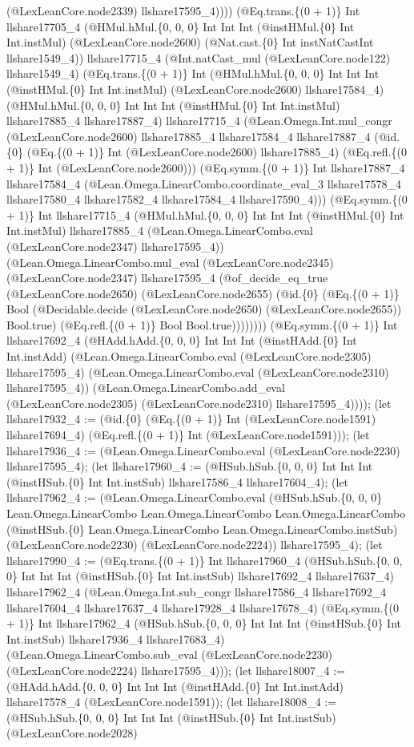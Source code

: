 \documentclass[11pt]{article}
\begin{document}
(@LexLeanCore.node2339) llshare17595\_4)))) (@Eq.trans.\{(0 + 1)\} Int llshare17705\_4 (@HMul.hMul.\{0, 0, 0\} Int Int Int (@instHMul.\{0\} Int Int.instMul) (@LexLeanCore.node2600) (@Nat.cast.\{0\} Int instNatCastInt llshare1549\_4)) llshare17715\_4 (@Int.natCast\_mul (@LexLeanCore.node122) llshare1549\_4) (@Eq.trans.\{(0 + 1)\} Int (@HMul.hMul.\{0, 0, 0\} Int Int Int (@instHMul.\{0\} Int Int.instMul) (@LexLeanCore.node2600) llshare17584\_4) (@HMul.hMul.\{0, 0, 0\} Int Int Int (@instHMul.\{0\} Int Int.instMul) llshare17885\_4 llshare17887\_4) llshare17715\_4 (@Lean.Omega.Int.mul\_congr (@LexLeanCore.node2600) llshare17885\_4 llshare17584\_4 llshare17887\_4 (@id.\{0\} (@Eq.\{(0 + 1)\} Int (@LexLeanCore.node2600) llshare17885\_4) (@Eq.refl.\{(0 + 1)\} Int (@LexLeanCore.node2600))) (@Eq.symm.\{(0 + 1)\} Int llshare17887\_4 llshare17584\_4 (@Lean.Omega.LinearCombo.coordinate\_eval\_3 llshare17578\_4 llshare17580\_4 llshare17582\_4 llshare17584\_4 llshare17590\_4))) (@Eq.symm.\{(0 + 1)\} Int llshare17715\_4 (@HMul.hMul.\{0, 0, 0\} Int Int Int (@instHMul.\{0\} Int Int.instMul) llshare17885\_4 (@Lean.Omega.LinearCombo.eval (@LexLeanCore.node2347) llshare17595\_4)) (@Lean.Omega.LinearCombo.mul\_eval (@LexLeanCore.node2345) (@LexLeanCore.node2347) llshare17595\_4 (@of\_decide\_eq\_true (@LexLeanCore.node2650) (@LexLeanCore.node2655) (@id.\{0\} (@Eq.\{(0 + 1)\} Bool (@Decidable.decide (@LexLeanCore.node2650) (@LexLeanCore.node2655)) Bool.true) (@Eq.refl.\{(0 + 1)\} Bool Bool.true)))))))) (@Eq.symm.\{(0 + 1)\} Int llshare17692\_4 (@HAdd.hAdd.\{0, 0, 0\} Int Int Int (@instHAdd.\{0\} Int Int.instAdd) (@Lean.Omega.LinearCombo.eval (@LexLeanCore.node2305) llshare17595\_4) (@Lean.Omega.LinearCombo.eval (@LexLeanCore.node2310) llshare17595\_4)) (@Lean.Omega.LinearCombo.add\_eval (@LexLeanCore.node2305) (@LexLeanCore.node2310) llshare17595\_4)))); (let llshare17932\_4 := (@id.\{0\} (@Eq.\{(0 + 1)\} Int (@LexLeanCore.node1591) llshare17694\_4) (@Eq.refl.\{(0 + 1)\} Int (@LexLeanCore.node1591))); (let llshare17936\_4 := (@Lean.Omega.LinearCombo.eval (@LexLeanCore.node2230) llshare17595\_4); (let llshare17960\_4 := (@HSub.hSub.\{0, 0, 0\} Int Int Int (@instHSub.\{0\} Int Int.instSub) llshare17586\_4 llshare17604\_4); (let llshare17962\_4 := (@Lean.Omega.LinearCombo.eval (@HSub.hSub.\{0, 0, 0\} Lean.Omega.LinearCombo Lean.Omega.LinearCombo Lean.Omega.LinearCombo (@instHSub.\{0\} Lean.Omega.LinearCombo Lean.Omega.LinearCombo.instSub) (@LexLeanCore.node2230) (@LexLeanCore.node2224)) llshare17595\_4); (let llshare17990\_4 := (@Eq.trans.\{(0 + 1)\} Int llshare17960\_4 (@HSub.hSub.\{0, 0, 0\} Int Int Int (@instHSub.\{0\} Int Int.instSub) llshare17692\_4 llshare17637\_4) llshare17962\_4 (@Lean.Omega.Int.sub\_congr llshare17586\_4 llshare17692\_4 llshare17604\_4 llshare17637\_4 llshare17928\_4 llshare17678\_4) (@Eq.symm.\{(0 + 1)\} Int llshare17962\_4 (@HSub.hSub.\{0, 0, 0\} Int Int Int (@instHSub.\{0\} Int Int.instSub) llshare17936\_4 llshare17683\_4) (@Lean.Omega.LinearCombo.sub\_eval (@LexLeanCore.node2230) (@LexLeanCore.node2224) llshare17595\_4))); (let llshare18007\_4 := (@HAdd.hAdd.\{0, 0, 0\} Int Int Int (@instHAdd.\{0\} Int Int.instAdd) llshare17578\_4 (@LexLeanCore.node1591)); (let llshare18008\_4 := (@HSub.hSub.\{0, 0, 0\} Int Int Int (@instHSub.\{0\} Int Int.instSub) (@LexLeanCore.node2028) 
\end{document}
